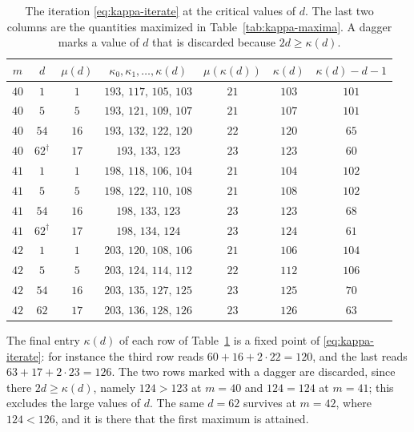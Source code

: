 \documentclass[11pt]{article}
\theoremstyle{definition}
\theoremstyle{remark}
\numberwithin{equation}{section}
\begin{document}
\begin{table}[ht]
\centering
\caption{The iteration \eqref{eq:kappa-iterate} at the critical values
of $d$. The last two columns are the quantities maximized in
Table~\ref{tab:kappa-maxima}. A dagger marks a value of $d$ that is discarded
because $2d\ge\kappa(d)$.}\label{tab:kappa-iterates}
\begin{tabular}{ccccccc}
\toprule
$m$ & $d$ & $\mu(d)$ & $\kappa_0,\kappa_1,\ldots,\kappa(d)$
& $\mu(\kappa(d))$ & $\kappa(d)$ & $\kappa(d)-d-1$\\
\midrule
$40$ & $1$ & $1$ & $193,\,117,\,105,\,103$ & $21$ & $103$ & $101$\\
$40$ & $5$ & $5$ & $193,\,121,\,109,\,107$ & $21$ & $107$ & $101$\\
$40$ & $54$ & $16$ & $193,\,132,\,122,\,120$ & $22$ & $120$ & $65$\\
$40$ & $62^{\dagger}$ & $17$ & $193,\,133,\,123$ & $23$ & $123$ & $60$\\
\midrule
$41$ & $1$ & $1$ & $198,\,118,\,106,\,104$ & $21$ & $104$ & $102$\\
$41$ & $5$ & $5$ & $198,\,122,\,110,\,108$ & $21$ & $108$ & $102$\\
$41$ & $54$ & $16$ & $198,\,133,\,123$ & $23$ & $123$ & $68$\\
$41$ & $62^{\dagger}$ & $17$ & $198,\,134,\,124$ & $23$ & $124$ & $61$\\
\midrule
$42$ & $1$ & $1$ & $203,\,120,\,108,\,106$ & $21$ & $106$ & $104$\\
$42$ & $5$ & $5$ & $203,\,124,\,114,\,112$ & $22$ & $112$ & $106$\\
$42$ & $54$ & $16$ & $203,\,135,\,127,\,125$ & $23$ & $125$ & $70$\\
$42$ & $62$ & $17$ & $203,\,136,\,128,\,126$ & $23$ & $126$ & $63$\\
\bottomrule
\end{tabular}
\end{table}

The final entry $\kappa(d)$ of each row of Table~\ref{tab:kappa-iterates} is a
fixed point of \eqref{eq:kappa-iterate}: for instance the third row
reads $60+16+2\cdot22=120$, and the last reads $63+17+2\cdot23=126$. The two rows
marked with a dagger are discarded, since there $2d\ge\kappa(d)$, namely
$124>123$ at $m=40$ and $124=124$ at $m=41$; this excludes the large values of
$d$. The same $d=62$ survives at $m=42$, where $124<126$, and it is there that
the first maximum is attained.
\end{document}

